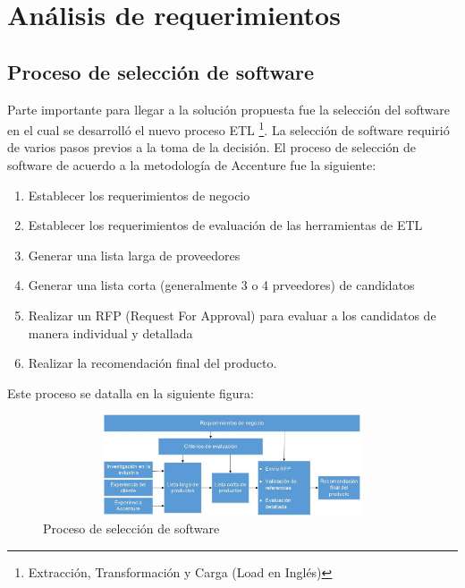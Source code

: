 \documentclass[a4paper,openright,12pt]{book}
\begin{document}
\chapter{An\'alisis de requerimientos} \label{cap.analisis}%

\section{Proceso de selecci\'on de software}
Parte importante para llegar a la soluci\'on propuesta fue la selecci\'on del software en el cual se desarroll\'o el nuevo proceso ETL \footnote{Extracci\'on, Transformaci\'on y Carga (Load en Ingl\'es)}. La selecci\'on de software requiri\'o de varios pasos previos a la toma de la decisi\'on. El proceso de selecci\'on de software de acuerdo a la metodolog\'ia de Accenture fue la siguiente:


\begin{enumerate}
\item Establecer los requerimientos de negocio
\item Establecer los requerimientos de evaluaci\'on de las herramientas de ETL
\item Generar una lista larga de proveedores
\item Generar una lista corta (generalmente 3 o 4 prveedores) de candidatos
\item Realizar un RFP (Request For Approval) para evaluar a los candidatos de manera individual y detallada
\item Realizar la recomendaci\'on final del producto. 
\end{enumerate}

Este proceso se datalla en la siguiente figura:
\begin{figure}[htb]
  \begin{center}
    \includegraphics[width=12cm, height=3cm, scale=0.5]{Proceso_seleccion_software.jpg}
        \caption{Proceso de selecci\'on de software}
    \label{fig:proceso}
  \end{center}
\end{figure}
\end{document}
